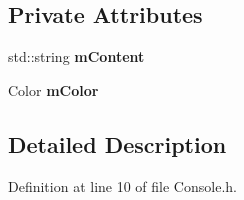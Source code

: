 \subsection*{Private Attributes}
\begin{DoxyCompactItemize}
\item 
std\+::string {\bfseries m\+Content}\hypertarget{class_console_1_1_line_a6c633f4b07d74ae96f6eaa2668c2f68b}{}\label{class_console_1_1_line_a6c633f4b07d74ae96f6eaa2668c2f68b}

\item 
Color {\bfseries m\+Color}\hypertarget{class_console_1_1_line_afa6e9698bc16a7dd72efe91d4d3d0eab}{}\label{class_console_1_1_line_afa6e9698bc16a7dd72efe91d4d3d0eab}

\end{DoxyCompactItemize}


\subsection{Detailed Description}


Definition at line 10 of file Console.\+h.

